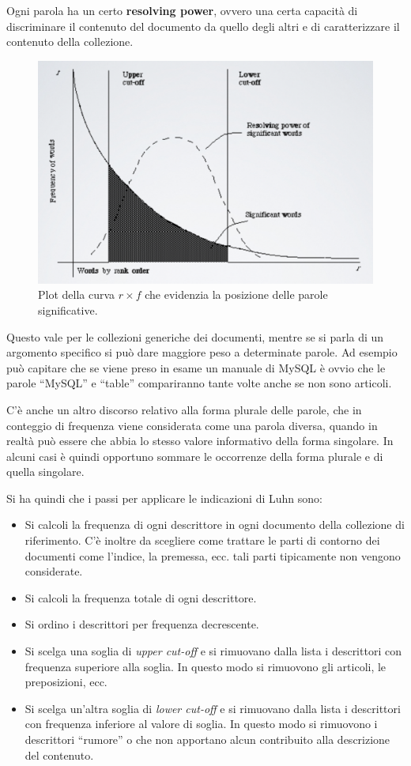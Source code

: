 Ogni parola ha un certo \textbf{resolving power}, ovvero una certa capacità di discriminare il contenuto del documento da quello degli altri e di caratterizzare il contenuto della collezione.

\begin{figure}[htbp]
	\centering
	\includegraphics[width=0.55\linewidth]{images/l3-cutoff}
	\caption{Plot della curva $r \times f$ che evidenzia la posizione delle parole significative.}
\end{figure}

Questo vale per le collezioni generiche dei documenti, mentre se si parla di un argomento specifico si può dare maggiore peso a determinate parole. Ad esempio può capitare che se viene preso in esame un manuale di MySQL è ovvio che le parole ``MySQL'' e  ``table'' compariranno tante volte anche se non sono articoli.

C'è anche un altro discorso relativo alla forma plurale delle parole, che in conteggio di frequenza viene considerata come una parola diversa, quando in realtà può essere che abbia lo stesso valore informativo della forma singolare. In alcuni casi è quindi opportuno sommare le occorrenze della forma plurale e di quella singolare.

Si ha quindi che i passi per applicare le indicazioni di Luhn sono:

\begin{itemize}
	\item Si calcoli la frequenza di ogni descrittore in ogni documento della collezione di riferimento. C'è inoltre da scegliere come trattare le parti di contorno dei documenti come l'indice, la premessa, ecc. tali parti tipicamente non vengono considerate.
	\item Si calcoli la frequenza totale di ogni descrittore.
	\item Si ordino i descrittori per frequenza decrescente.
	\item Si scelga una soglia di \textit{upper cut-off} e si rimuovano dalla lista i descrittori con frequenza superiore alla soglia. In questo modo si rimuovono gli articoli, le preposizioni, ecc.
	\item Si scelga un'altra soglia di \textit{lower cut-off} e si rimuovano dalla lista i descrittori con frequenza inferiore al valore di soglia. In questo modo si rimuovono i descrittori ``rumore''  o che non apportano alcun contribuito alla descrizione del contenuto.
\end{itemize}

